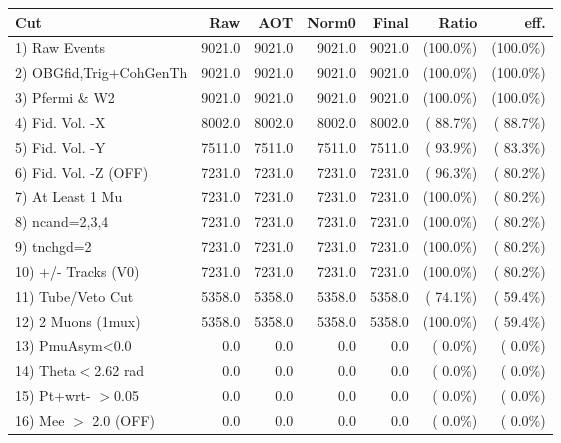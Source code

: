  \begin{table}[h!]\centering
 \begin{tabular}{||l||r|r|r|r|r|r||}
 \hline
 \hline
 Cut & Raw & AOT & Norm0 & Final & Ratio & eff.       \\
 \hline
  1) Raw Events           &       9021.0 &       9021.0 &       9021.0 &       9021.0 & (100.0\%) & (100.0\%) \\
  2) OBGfid,Trig+CohGenTh &       9021.0 &       9021.0 &       9021.0 &       9021.0 & (100.0\%) & (100.0\%) \\
  3) Pfermi \& W2         &       9021.0 &       9021.0 &       9021.0 &       9021.0 & (100.0\%) & (100.0\%) \\
  4) Fid. Vol. -X         &       8002.0 &       8002.0 &       8002.0 &       8002.0 & ( 88.7\%) & ( 88.7\%) \\
  5) Fid. Vol. -Y         &       7511.0 &       7511.0 &       7511.0 &       7511.0 & ( 93.9\%) & ( 83.3\%) \\
  6) Fid. Vol. -Z (OFF)   &       7231.0 &       7231.0 &       7231.0 &       7231.0 & ( 96.3\%) & ( 80.2\%) \\
  7) At Least 1 Mu        &       7231.0 &       7231.0 &       7231.0 &       7231.0 & (100.0\%) & ( 80.2\%) \\
  8) ncand=2,3,4          &       7231.0 &       7231.0 &       7231.0 &       7231.0 & (100.0\%) & ( 80.2\%) \\
  9) tnchgd=2             &       7231.0 &       7231.0 &       7231.0 &       7231.0 & (100.0\%) & ( 80.2\%) \\
 10) +/- Tracks (V0)      &       7231.0 &       7231.0 &       7231.0 &       7231.0 & (100.0\%) & ( 80.2\%) \\
 11) Tube/Veto Cut        &       5358.0 &       5358.0 &       5358.0 &       5358.0 & ( 74.1\%) & ( 59.4\%) \\
 12) 2 Muons (1mux)       &       5358.0 &       5358.0 &       5358.0 &       5358.0 & (100.0\%) & ( 59.4\%) \\
 13) PmuAsym<0.0          &          0.0 &          0.0 &          0.0 &          0.0 & (  0.0\%) & (  0.0\%) \\
 14) Theta$<$2.62 rad     &          0.0 &          0.0 &          0.0 &          0.0 & (  0.0\%) & (  0.0\%) \\
 15) Pt+wrt- $>$0.05      &          0.0 &          0.0 &          0.0 &          0.0 & (  0.0\%) & (  0.0\%) \\
 16) Mee $>$ 2.0  (OFF)   &          0.0 &          0.0 &          0.0 &          0.0 & (  0.0\%) & (  0.0\%) \\

\end{tabular}
\end{table}
